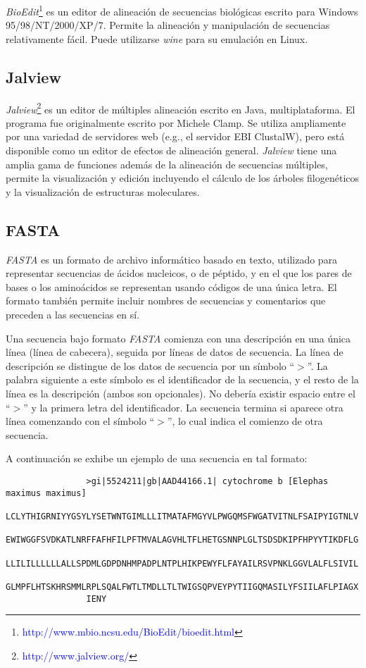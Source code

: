\documentclass[12pt,a4paper,spanish]{article}
\begin{document}
		\par \textit{BioEdit}\footnote{\textcolor{blue}{http://www.mbio.ncsu.edu/BioEdit/bioedit.html}} es un editor de 		alineación de secuencias biológicas escrito para Windows 95/98/NT/2000/XP/7. Permite la alineación y manipulación 			de secuencias relativamente fácil. Puede utilizarse \textit{wine} para su emulación en Linux.

	\subsection{Jalview}
		\par \textit{Jalview}\footnote{\textcolor{blue}{http://www.jalview.org/}} es un editor de múltiples alineación 			escrito en Java, multiplataforma. El programa fue originalmente escrito por Michele Clamp. Se utiliza ampliamente 			por una variedad de servidores web (e.g., el servidor EBI ClustalW), pero está disponible como un editor 			de efectos de alineación general. \textit{Jalview} tiene una amplia gama de funciones además de la alineación de 			secuencias múltiples, permite la visualización y edición incluyendo el cálculo de los árboles filogenéticos y la 			visualización de estructuras moleculares. 

	\subsection{FASTA}
		\par \textit{FASTA} \cite{1} es un formato de archivo informático basado en texto, utilizado para representar 			secuencias de ácidos nucleicos, o de péptido, y en el que los pares de bases o los aminoácidos se representan 			usando códigos de una única letra. El formato también permite incluir nombres de secuencias y comentarios que 			preceden a las secuencias en sí.	

		\par Una secuencia bajo formato \textit{FASTA} comienza con una descripción en una única línea (línea de 			cabecera), seguida por líneas de datos de secuencia. La línea de descripción se distingue de los datos de 			secuencia por un símbolo ``$>$''. La palabra siguiente a este símbolo es el identificador de la secuencia, y el 		resto de la línea es la descripción (ambos son opcionales). No debería existir espacio entre el ``$>$'' y la 			primera letra del identificador. La secuencia termina si aparece otra línea comenzando con el símbolo ``$>$'', lo 			cual indica el comienzo de otra secuencia. 
		\par A continuación se exhibe un ejemplo de una secuencia en tal formato:	
		\begin{verbatim}
				>gi|5524211|gb|AAD44166.1| cytochrome b [Elephas maximus maximus]
				LCLYTHIGRNIYYGSYLYSETWNTGIMLLLITMATAFMGYVLPWGQMSFWGATVITNLFSAIPYIGTNLV
				EWIWGGFSVDKATLNRFFAFHFILPFTMVALAGVHLTFLHETGSNNPLGLTSDSDKIPFHPYYTIKDFLG
				LLILILLLLLLALLSPDMLGDPDNHMPADPLNTPLHIKPEWYFLFAYAILRSVPNKLGGVLALFLSIVIL
				GLMPFLHTSKHRSMMLRPLSQALFWTLTMDLLTLTWIGSQPVEYPYTIIGQMASILYFSIILAFLPIAGX
				IENY
		\end{verbatim}
\end{document}
